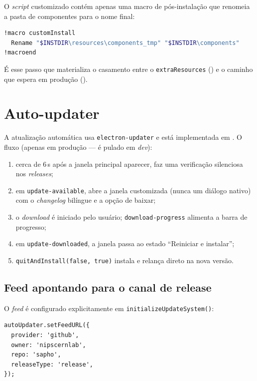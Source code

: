 \noindent
O \emph{script} customizado  contém apenas uma macro de
pós-instalação que renomeia a pasta de componentes para o nome final:

\begin{lstlisting}[language=bash]
!macro customInstall
  Rename "$INSTDIR\resources\components_tmp" "$INSTDIR\components"
!macroend
\end{lstlisting}

\noindent
É esse passo que materializa o casamento entre o \texttt{extraResources}
() e o caminho que  espera em produção
().

\section{Auto-updater}
\label{sec:16-updater}

A atualização automática usa \lstinline|electron-updater| e está implementada em
. O fluxo (apenas em produção --- é pulado em \emph{dev}):

\begin{enumerate}[nosep]
  \item cerca de 6\,s após a janela principal aparecer, faz uma verificação
        silenciosa nos \emph{releases};
  \item em \texttt{update-available}, abre a janela customizada
         (nunca um diálogo nativo) com o
        \emph{changelog} bilíngue e a opção de baixar;
  \item o \emph{download} é iniciado pelo usuário; \texttt{download-progress}
        alimenta a barra de progresso;
  \item em \texttt{update-downloaded}, a janela passa ao estado
        \enquote{Reiniciar e instalar};
  \item \lstinline|quitAndInstall(false, true)| instala e relança direto na nova
        versão.
\end{enumerate}

\subsection{Feed apontando para o canal de release}

O \emph{feed} é configurado explicitamente em
\lstinline|initializeUpdateSystem()|:

\begin{lstlisting}
autoUpdater.setFeedURL({
  provider: 'github',
  owner: 'nipscernlab',
  repo: 'sapho',
  releaseType: 'release',
});
\end{lstlisting}

